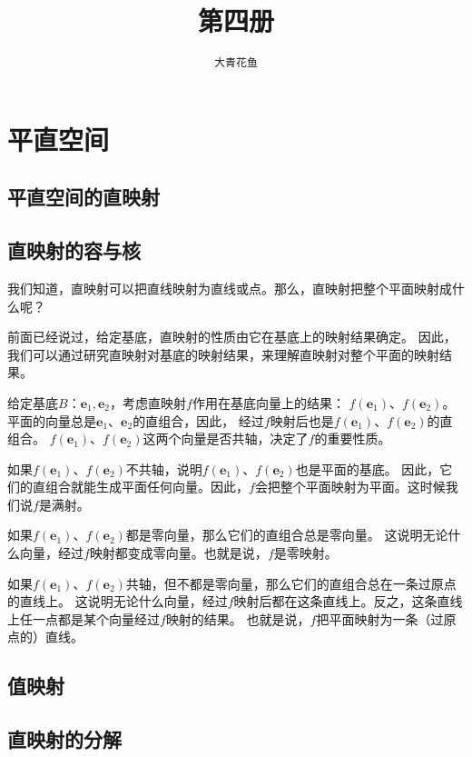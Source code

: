 \documentclass[12pt,UTF8]{ctexbook}
\title{\zihao{0} \bfseries 第四册}
\author{\zihao{2} \texttt{大青花鱼}}
\date{}
\begin{document}
\maketitle
\tableofcontents
\newpage

\chapter{平直空间}

\section{平直空间的直映射}

\section{直映射的容与核}
我们知道，直映射可以把直线映射为直线或点。那么，直映射把整个平面映射成什么呢？

前面已经说过，给定基底，直映射的性质由它在基底上的映射结果确定。
因此，我们可以通过研究直映射对基底的映射结果，来理解直映射对整个平面的映射结果。

给定基底$B$：$\mathbf{e}_1, \mathbf{e}_2$，考虑直映射$f$作用在基底向量上的结果：
$f(\mathbf{e}_1)$、$f(\mathbf{e}_2)$。平面的向量总是$\mathbf{e}_1$、$\mathbf{e}_2$的直组合，因此，
经过$f$映射后也是$f(\mathbf{e}_1)$、$f(\mathbf{e}_2)$的直组合。
$f(\mathbf{e}_1)$、$f(\mathbf{e}_2)$这两个向量是否共轴，决定了$f$的重要性质。

如果$f(\mathbf{e}_1)$、$f(\mathbf{e}_2)$不共轴，说明$f(\mathbf{e}_1)$、$f(\mathbf{e}_2)$也是平面的基底。
因此，它们的直组合就能生成平面任何向量。因此，$f$会把整个平面映射为平面。这时候我们说$f$是满射。

如果$f(\mathbf{e}_1)$、$f(\mathbf{e}_2)$都是零向量，那么它们的直组合总是零向量。
这说明无论什么向量，经过$f$映射都变成零向量。也就是说，$f$是零映射。

如果$f(\mathbf{e}_1)$、$f(\mathbf{e}_2)$共轴，但不都是零向量，那么它们的直组合总在一条过原点的直线上。
这说明无论什么向量，经过$f$映射后都在这条直线上。反之，这条直线上任一点都是某个向量经过$f$映射的结果。
也就是说，$f$把平面映射为一条（过原点的）直线。

\section{值映射}

\section{直映射的分解}
\end{document}
